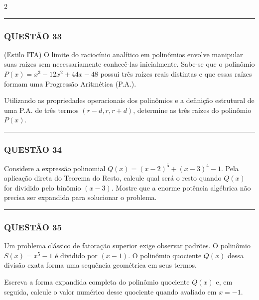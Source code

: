 \documentclass[11pt, a4paper]{article}
\begin{document}
\begin{multicols*}{2}
\vspace{0cm} \noindent\textcolor{CorLinha}{\rule{\linewidth}{0.5pt}} \vspace{-0.2cm}
\subsubsection*{QUESTÃO 33}

(Estilo ITA) O limite do raciocínio analítico em polinômios envolve manipular suas raízes sem necessariamente conhecê-las inicialmente. Sabe-se que o polinômio $ P(x) = x^3 - 12x^2 + 44x - 48 $ possui três raízes reais distintas e que essas raízes formam uma Progressão Aritmética (P.A.). 

Utilizando as propriedades operacionais dos polinômios e a definição estrutural de uma P.A. de três termos $ (r - d, r, r + d) $, determine as três raízes do polinômio $ P(x) $.

\vspace{0cm} \noindent\textcolor{CorLinha}{\rule{\linewidth}{0.5pt}} \vspace{-0.2cm}
\subsubsection*{QUESTÃO 34}

Considere a expressão polinomial $ Q(x) = (x - 2)^5 + (x - 3)^4 - 1 $. Pela aplicação direta do Teorema do Resto, calcule qual será o resto quando $ Q(x) $ for dividido pelo binômio $ (x - 3) $. Mostre que a enorme potência algébrica não precisa ser expandida para solucionar o problema.

\vspace{0cm} \noindent\textcolor{CorLinha}{\rule{\linewidth}{0.5pt}} \vspace{-0.2cm}
\subsubsection*{QUESTÃO 35}

Um problema clássico de fatoração superior exige observar padrões. O polinômio $ S(x) = x^5 - 1 $ é dividido por $ (x - 1) $. O polinômio quociente $ Q(x) $ dessa divisão exata forma uma sequência geométrica em seus termos. 

Escreva a forma expandida completa do polinômio quociente $ Q(x) $ e, em seguida, calcule o valor numérico desse quociente quando avaliado em $ x = -1 $.

\end{multicols*}
\end{document}
